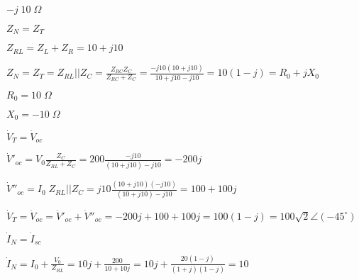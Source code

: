 \documentclass{article}
\def\lthtmlcheckvsize{\ifdim\ht\sizebox<\vsize 
  \ifdim\wd\sizebox<\hsize\expandafter\hfill\fi \expandafter\vfill
  \else\expandafter\vss\fi}%
\begin{document}
{\newpage\clearpage
{}%
$ -j\;10\;\Omega$%
\lthtmlindisplaymathZ
\lthtmlcheckvsize\clearpage}

{\newpage\clearpage
{}%
$ Z_N=Z_T$%
\lthtmlindisplaymathZ
\lthtmlcheckvsize\clearpage}

{\newpage\clearpage
{}%
$ Z_{RL}=Z_L+Z_R=10+j10$%
\lthtmlindisplaymathZ
\lthtmlcheckvsize\clearpage}

{\newpage\clearpage
{}%
$\displaystyle Z_N=Z_T=Z_{RL}||Z_C=\frac{Z_{RC}Z_C}{Z_{RC}+Z_C}
=\frac{-j10(10+j10)}{10+j10-j10}=10(1-j)=R_0+jX_0$%
\lthtmlindisplaymathZ
\lthtmlcheckvsize\clearpage}

{\newpage\clearpage
{}%
$ R_0=10\;\Omega$%
\lthtmlindisplaymathZ
\lthtmlcheckvsize\clearpage}

{\newpage\clearpage
{}%
$ X_0=-10\;\Omega$%
\lthtmlindisplaymathZ
\lthtmlcheckvsize\clearpage}

{\newpage\clearpage
{}%
$ \dot{V}_T=\dot{V}_{oc}$%
\lthtmlindisplaymathZ
\lthtmlcheckvsize\clearpage}

{\newpage\clearpage
{}%
$\displaystyle \dot{V}'_{oc}=V_0\frac{Z_C}{Z_{RL}+Z_C}
=200\frac{-j10}{(10+j10)-j10}=-200j$%
\lthtmlindisplaymathZ
\lthtmlcheckvsize\clearpage}

{\newpage\clearpage
{}%
$\displaystyle \dot{V}''_{oc}=I_0\;Z_{RL}||Z_C
=j10\frac{(10+j10)(-j10)}{(10+j10)-j10}=100+100j$%
\lthtmlindisplaymathZ
\lthtmlcheckvsize\clearpage}

{\newpage\clearpage
{}%
$\displaystyle \dot{V}_T=\dot{V}_{oc}=\dot{V}'_{oc}+\dot{V}''_{oc}=-200j+100+100j=100(1-j)
=100\sqrt{2}\angle(-45^\circ)$%
\lthtmlindisplaymathZ
\lthtmlcheckvsize\clearpage}

{\newpage\clearpage
{}%
$ \dot{I}_N=\dot{I}_{sc}$%
\lthtmlindisplaymathZ
\lthtmlcheckvsize\clearpage}

{\newpage\clearpage
{}%
$\displaystyle \dot{I}_N=I_0+\frac{V_0}{Z_{RL}}
=10j+\frac{200}{10+10j}=10j+\frac{20(1-j)}{(1+j)(1-j)}=10$%
\lthtmlindisplaymathZ
\lthtmlcheckvsize\clearpage}
\end{document}
